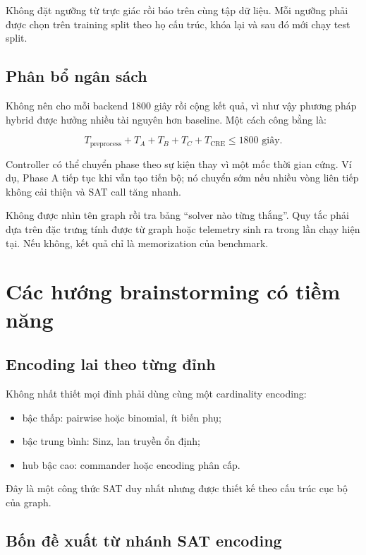 \documentclass[11pt,a4paper,oneside]{scrreprt}
\begin{document}
Không đặt ngưỡng từ trực giác rồi báo trên cùng tập dữ liệu. Mỗi ngưỡng phải được chọn trên training split theo họ cấu trúc, khóa lại và sau đó mới chạy test split.

\section{Phân bổ ngân sách}

Không nên cho mỗi backend 1800 giây rồi cộng kết quả, vì như vậy phương pháp hybrid được hưởng nhiều tài nguyên hơn baseline. Một cách công bằng là:

\[
  T_{\mathrm{preprocess}}+T_A+T_B+T_C+T_{\mathrm{CRE}} \leq 1800\text{ giây}.
\]

Controller có thể chuyển phase theo sự kiện thay vì một mốc thời gian cứng. Ví dụ, Phase A tiếp tục khi vẫn tạo tiến bộ; nó chuyển sớm nếu nhiều vòng liên tiếp không cải thiện và SAT call tăng nhanh.

\begin{warningbox}
Không được nhìn tên graph rồi tra bảng ``solver nào từng thắng''. Quy tắc phải dựa trên đặc trưng tính được từ graph hoặc telemetry sinh ra trong lần chạy hiện tại. Nếu không, kết quả chỉ là memorization của benchmark.
\end{warningbox}

\chapter{Các hướng brainstorming có tiềm năng}

\section{Encoding lai theo từng đỉnh}

Không nhất thiết mọi đỉnh phải dùng cùng một cardinality encoding:

\begin{itemize}
  \item bậc thấp: pairwise hoặc binomial, ít biến phụ;
  \item bậc trung bình: Sinz, lan truyền ổn định;
  \item hub bậc cao: commander hoặc encoding phân cấp.
\end{itemize}

Đây là một công thức SAT duy nhất nhưng được thiết kế theo cấu trúc cục bộ của graph.

\section{Bốn đề xuất từ nhánh SAT encoding}
\end{document}
